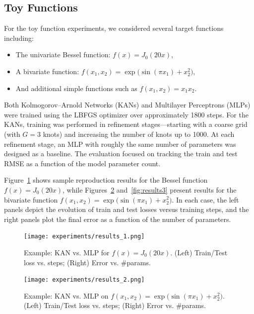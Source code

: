 \documentclass[conference]{IEEEtran}
\begin{document}
\subsection{Toy Functions}

For the toy function experiments, we considered several target functions
including:
\begin{itemize}
    \item The univariate Bessel function: \( f(x) = J_0(20x) \),
    \item A bivariate function: \( f(x_1,x_2) = \exp\bigl(\sin(\pi x_1) + x_2^2\bigr) \),
    \item And additional simple functions such as \( f(x_1,x_2) = x_1x_2 \).
\end{itemize}

Both Kolmogorov–Arnold Networks (KANs) and Multilayer Perceptrons (MLPs) were
trained using the LBFGS optimizer over approximately 1800 steps. For the KANs,
training was performed in refinement stages---starting with a coarse grid (with
\( G=3 \) knots) and increasing the number of knots up to 1000. At each
refinement stage, an MLP with roughly the same number of parameters was
designed as a baseline. The evaluation focused on tracking the train and test
RMSE as a function of the model parameter count.

Figure~\ref{fig:results1} shows sample reproduction results for the Bessel
function \( f(x)=J_0(20x) \), while Figures~\ref{fig:results2}
and~\ref{fig:results3} present results for the bivariate function \(
f(x_1,x_2)=\exp\bigl(\sin(\pi x_1)+x_2^2\bigr) \). In each case, the left
panels depict the evolution of train and test losses versus training steps, and
the right panels plot the final error as a function of the number of
parameters.

\begin{figure}[H]
    \centering
    \texttt{[image: experiments/results\_1.png]}
    \caption{Example: KAN vs. MLP for \(f(x)=J_0(20x)\). (Left) Train/Test loss vs. steps; (Right) Error vs. \#params.}
    \label{fig:results1}
\end{figure}

\begin{figure}[H]
    \centering
    \texttt{[image: experiments/results\_2.png]}
    \caption{Example: KAN vs. MLP on \(f(x_1,x_2)=\exp\bigl(\sin(\pi x_1)+x_2^2\bigr)\). (Left) Train/Test loss vs. steps; (Right) Error vs. \#params.}
    \label{fig:results2}
\end{figure}
\end{document}
